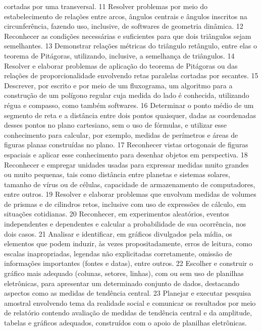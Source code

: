 {{{				cortadas por uma transversal.
			}
			{11}{%
				Resolver problemas por meio do estabelecimento de relações entre arcos,
				ângulos centrais e ângulos inscritos na circunferência, fazendo uso, inclusive, de softwares de
				geometria dinâmica.
			}
			{12}{%
				Reconhecer as condições necessárias e suficientes para que dois triângulos
				sejam semelhantes.
			}
			{13}{%
				Demonstrar relações métricas do triângulo retângulo, entre elas o teorema de
				Pitágoras, utilizando, inclusive, a semelhança de triângulos.
			}
			{14}{%
				Resolver e elaborar problemas de aplicação do teorema de Pitágoras ou das
				relações de proporcionalidade envolvendo retas paralelas cortadas por secantes.
			}
			{15}{%
				Descrever, por escrito e por meio de um fluxograma, um algoritmo para a
				construção de um polígono regular cuja medida do lado é conhecida, utilizando régua e
				compasso, como também softwares.
			}
			{16}{%
				Determinar o ponto médio de um segmento de reta e a distância entre dois pontos
				quaisquer, dadas as coordenadas desses pontos no plano cartesiano, sem o uso de fórmulas, e
				utilizar esse conhecimento para calcular, por exemplo, medidas de perímetros e áreas de figuras
				planas construídas no plano.
			}
			{17}{%
				Reconhecer vistas ortogonais de figuras espaciais e aplicar esse conhecimento
				para desenhar objetos em perspectiva.
			}
			{18}{%
				Reconhecer e empregar unidades usadas para expressar medidas muito grandes
				ou muito pequenas, tais como distância entre planetas e sistemas solares, tamanho de vírus ou
				de células, capacidade de armazenamento de computadores, entre outros.
			}
			{19}{%
				Resolver e elaborar problemas que envolvam medidas de volumes de prismas e
				de cilindros retos, inclusive com uso de expressões de cálculo, em situações cotidianas.
			}
			{20}{%
				Reconhecer, em experimentos aleatórios, eventos independentes e dependentes
				e calcular a probabilidade de sua ocorrência, nos dois casos.
			}
			{21}{%
				Analisar e identificar, em gráficos divulgados pela mídia, os elementos que
				podem induzir, às vezes propositadamente, erros de leitura, como escalas inapropriadas,
				legendas não explicitadas corretamente, omissão de informações importantes (fontes e
				datas), entre outros.
			}
			{22}{%
				Escolher e construir o gráfico mais adequado (colunas, setores, linhas), com
				ou sem uso de planilhas eletrônicas, para apresentar um determinado conjunto de dados,
				destacando aspectos como as medidas de tendência central.
			}
			{23}{%
				Planejar e executar pesquisa amostral envolvendo tema da realidade social e
				comunicar os resultados por meio de relatório contendo avaliação de medidas de tendência central
				e da amplitude, tabelas e gráficos adequados, construídos com o apoio de planilhas eletrônicas.
			}
	}
}

